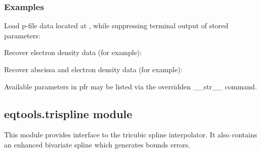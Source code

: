 \documentclass[letterpaper,10pt,english]{sphinxmanual}
\begin{document}
\begin{fulllineitems}
\begin{quote}
\begin{description}
\end{description}\end{quote}
\subsubsection*{Examples}

Load p-file data located at , while suppressing terminal
output of stored parameters:

\begin{sphinxVerbatim}[commandchars=\\\{\}]
  
\end{sphinxVerbatim}

Recover electron density data (for example):

\begin{sphinxVerbatim}[commandchars=\\\{\}]
  
\end{sphinxVerbatim}

Recover abscissa and electron density data (for example):

\begin{sphinxVerbatim}[commandchars=\\\{\}]
  
  
\end{sphinxVerbatim}

Available parameters in pfr may be listed via the overridden \_\_str\_\_
command.

\end{fulllineitems}



\subsection{eqtools.trispline module}
\label{\detokenize{eqtools:module-eqtools.trispline}}\label{\detokenize{eqtools:eqtools-trispline-module}}
This module provides interface to the tricubic spline interpolator. It also
contains an enhanced bivariate spline which generates bounds errors.
\end{document}
